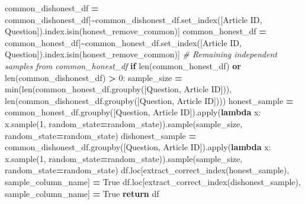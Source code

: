 \documentclass[
]{article}
\newenvironment{Shaded}{\begin{snugshade}}{\end{snugshade}}
\newcommand{\BuiltInTok}[1]{#1}
\newcommand{\CommentTok}[1]{\textcolor[rgb]{0.56,0.35,0.01}{\textit{#1}}}
\newcommand{\ControlFlowTok}[1]{\textcolor[rgb]{0.13,0.29,0.53}{\textbf{#1}}}
\newcommand{\DecValTok}[1]{\textcolor[rgb]{0.00,0.00,0.81}{#1}}
\newcommand{\KeywordTok}[1]{\textcolor[rgb]{0.13,0.29,0.53}{\textbf{#1}}}
\newcommand{\NormalTok}[1]{#1}
\newcommand{\OperatorTok}[1]{\textcolor[rgb]{0.81,0.36,0.00}{\textbf{#1}}}
\newcommand{\StringTok}[1]{\textcolor[rgb]{0.31,0.60,0.02}{#1}}
\newcommand{\VariableTok}[1]{\textcolor[rgb]{0.00,0.00,0.00}{#1}}
\begin{document}
\begin{Shaded}
\begin{Highlighting}[]
\NormalTok{        common\_dishonest\_df }\OperatorTok{=}\NormalTok{ common\_dishonest\_df[}\OperatorTok{\textasciitilde{}}\NormalTok{common\_dishonest\_df.set\_index([}\StringTok{\textquotesingle{}Article ID\textquotesingle{}}\NormalTok{, }\StringTok{\textquotesingle{}Question\textquotesingle{}}\NormalTok{]).index.isin(honest\_remove\_common)]}
\NormalTok{        common\_honest\_df }\OperatorTok{=}\NormalTok{ common\_honest\_df[}\OperatorTok{\textasciitilde{}}\NormalTok{common\_honest\_df.set\_index([}\StringTok{\textquotesingle{}Article ID\textquotesingle{}}\NormalTok{, }\StringTok{\textquotesingle{}Question\textquotesingle{}}\NormalTok{]).index.isin(honest\_remove\_common)]}
    \CommentTok{\# Remaining independent samples from common\_honest\_df}
    \ControlFlowTok{if} \BuiltInTok{len}\NormalTok{(common\_honest\_df) }\KeywordTok{or} \BuiltInTok{len}\NormalTok{(common\_dishonest\_df) }\OperatorTok{\textgreater{}} \DecValTok{0}\NormalTok{:}
\NormalTok{        sample\_size }\OperatorTok{=} \BuiltInTok{min}\NormalTok{(}\BuiltInTok{len}\NormalTok{(common\_honest\_df.groupby([}\StringTok{\textquotesingle{}Question\textquotesingle{}}\NormalTok{, }\StringTok{\textquotesingle{}Article ID\textquotesingle{}}\NormalTok{])), }\BuiltInTok{len}\NormalTok{(common\_dishonest\_df.groupby([}\StringTok{\textquotesingle{}Question\textquotesingle{}}\NormalTok{, }\StringTok{\textquotesingle{}Article ID\textquotesingle{}}\NormalTok{])))}
\NormalTok{        honest\_sample }\OperatorTok{=}\NormalTok{ common\_honest\_df.groupby([}\StringTok{\textquotesingle{}Question\textquotesingle{}}\NormalTok{, }\StringTok{\textquotesingle{}Article ID\textquotesingle{}}\NormalTok{]).}\BuiltInTok{apply}\NormalTok{(}\KeywordTok{lambda}\NormalTok{ x: x.sample(}\DecValTok{1}\NormalTok{, random\_state}\OperatorTok{=}\NormalTok{random\_state)).sample(sample\_size, random\_state}\OperatorTok{=}\NormalTok{random\_state)}
\NormalTok{        dishonest\_sample }\OperatorTok{=}\NormalTok{ common\_dishonest\_df.groupby([}\StringTok{\textquotesingle{}Question\textquotesingle{}}\NormalTok{, }\StringTok{\textquotesingle{}Article ID\textquotesingle{}}\NormalTok{]).}\BuiltInTok{apply}\NormalTok{(}\KeywordTok{lambda}\NormalTok{ x: x.sample(}\DecValTok{1}\NormalTok{, random\_state}\OperatorTok{=}\NormalTok{random\_state)).sample(sample\_size, random\_state}\OperatorTok{=}\NormalTok{random\_state)}
\NormalTok{        df.loc[extract\_correct\_index(honest\_sample), sample\_column\_name] }\OperatorTok{=} \VariableTok{True}
\NormalTok{        df.loc[extract\_correct\_index(dishonest\_sample), sample\_column\_name] }\OperatorTok{=} \VariableTok{True}
    \ControlFlowTok{return}\NormalTok{ df}



\end{Highlighting}
\end{Shaded}
\end{document}
